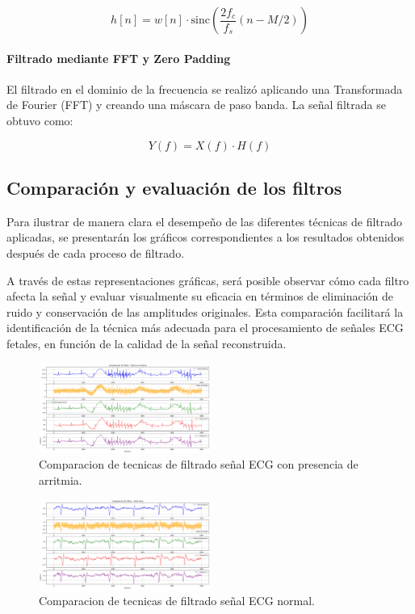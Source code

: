 \documentclass[10pt, conference]{IEEEtran}
\begin{document}
\[
h[n] = w[n] \cdot \text{sinc}\left(\frac{2f_c}{f_s}(n - M/2)\right)
\]


\paragraph{Filtrado mediante FFT y Zero Padding}
El filtrado en el dominio de la frecuencia se realizó aplicando una Transformada de Fourier (FFT) y creando una máscara de paso banda. La señal filtrada se obtuvo como:

\[
Y(f) = X(f) \cdot H(f)
\]

\subsection{Comparación y evaluación de los filtros}

Para ilustrar de manera clara el desempeño de las diferentes técnicas de filtrado aplicadas, se presentarán los gráficos correspondientes a los resultados obtenidos después de cada proceso de filtrado.

A través de estas representaciones gráficas, será posible observar cómo cada filtro afecta la señal y evaluar visualmente su eficacia en términos de eliminación de ruido y conservación de las amplitudes originales. Esta comparación facilitará la identificación de la técnica más adecuada para el procesamiento de señales ECG fetales, en función de la calidad de la señal reconstruida.

\begin{figure}[htbp]
\centerline{\includegraphics[width=0.5\textwidth]{Comparacion arritmia.png}}
\caption{Comparacion de tecnicas de filtrado señal ECG con presencia de arritmia.}
\label{fig:filtered_signal}
\end{figure}

\begin{figure}[htbp]
\centerline{\includegraphics[width=0.5\textwidth]{Comparacion normal.png}}
\caption{Comparacion de tecnicas de filtrado señal ECG normal.}
\label{fig:comparison_signal}
\end{figure}
\end{document}
